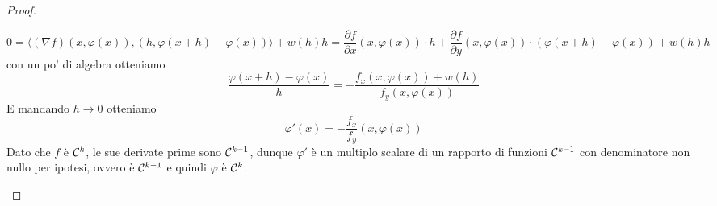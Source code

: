\documentclass{article}
\begin{document}
\begin{proof}
\begin{itemize}
        \[0=\langle (\nabla f) (x,\varphi(x)), (h, \varphi(x+h) - \varphi(x)) \rangle + w(h)h = \frac{\partial f}{\partial x}(x,\varphi(x)) \cdot h + \frac{\partial f}{\partial y} (x,\varphi(x)) \cdot (\varphi(x+h) - \varphi(x)) + w(h)h\]
        con un po' di algebra otteniamo
        \[\frac{\varphi(x+h) - \varphi(x)}{h} = -\frac{f_x(x,\varphi(x)) + w(h)}{f_y(x,\varphi(x))}\]
        E mandando $h\to 0$ otteniamo
        \[\varphi'(x) = -\frac{f_x}{f_y}(x,\varphi(x))\]
        Dato che $f$ è $\mathcal{C}^k$, le sue derivate prime sono $\mathcal{C}^{k-1}$, dunque $\varphi'$ è un multiplo scalare di un rapporto di funzioni $\mathcal{C}^{k-1}$ con denominatore non nullo per ipotesi, ovvero è $\mathcal{C}^{k-1}$ e quindi $\varphi$ è $\mathcal{C}^k$.
    \end{itemize}
\end{proof}
\end{document}

